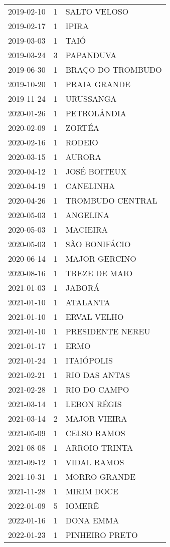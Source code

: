\begin{longtable}[htbp]{ccl}
2019-02-10 & 1 & SALTO VELOSO \\
2019-02-17 & 1 & IPIRA \\
2019-03-03 & 1 & TAIÓ \\
2019-03-24 & 3 & PAPANDUVA \\
2019-06-30 & 1 & BRAÇO DO TROMBUDO \\
2019-10-20 & 1 & PRAIA GRANDE \\
2019-11-24 & 1 & URUSSANGA \\
2020-01-26 & 1 & PETROLÂNDIA \\
2020-02-09 & 1 & ZORTÉA \\
2020-02-16 & 1 & RODEIO \\
2020-03-15 & 1 & AURORA \\
2020-04-12 & 1 & JOSÉ BOITEUX \\
2020-04-19 & 1 & CANELINHA \\
2020-04-26 & 1 & TROMBUDO CENTRAL \\
2020-05-03 & 1 & ANGELINA \\
2020-05-03 & 1 & MACIEIRA \\
2020-05-03 & 1 & SÃO BONIFÁCIO \\
2020-06-14 & 1 & MAJOR GERCINO \\
2020-08-16 & 1 & TREZE DE MAIO \\
2021-01-03 & 1 & JABORÁ \\
2021-01-10 & 1 & ATALANTA \\
2021-01-10 & 1 & ERVAL VELHO \\
2021-01-10 & 1 & PRESIDENTE NEREU \\
2021-01-17 & 1 & ERMO \\
2021-01-24 & 1 & ITAIÓPOLIS \\
2021-02-21 & 1 & RIO DAS ANTAS \\
2021-02-28 & 1 & RIO DO CAMPO \\
2021-03-14 & 1 & LEBON RÉGIS \\
2021-03-14 & 2 & MAJOR VIEIRA \\
2021-05-09 & 1 & CELSO RAMOS \\
2021-08-08 & 1 & ARROIO TRINTA \\
2021-09-12 & 1 & VIDAL RAMOS \\
2021-10-31 & 1 & MORRO GRANDE \\
2021-11-28 & 1 & MIRIM DOCE \\
2022-01-09 & 5 & IOMERÊ \\
2022-01-16 & 1 & DONA EMMA \\
2022-01-23 & 1 & PINHEIRO PRETO \\

\end{longtable}
